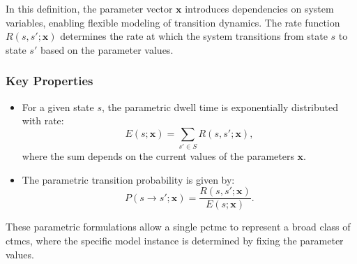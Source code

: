 In this definition, the parameter vector $\mathbf{x}$ introduces dependencies on system variables, enabling flexible modeling of transition dynamics.
The rate function $R(s, s'; \mathbf{x})$ determines the rate at which the system transitions from state $s$ to state $s'$ based on the parameter values.

\subsubsection*{Key Properties}

\begin{itemize}
    \item For a given state $s$, the parametric dwell time is exponentially distributed with rate:
    \begin{equation}
        E(s; \mathbf{x}) = \sum_{s' \in S} R(s, s'; \mathbf{x}),
    \end{equation}
    where the sum depends on the current values of the parameters $\mathbf{x}$.
    \item The parametric transition probability is given by:
    \begin{equation}
        P(s \rightarrow s'; \mathbf{x}) = \frac{R(s, s'; \mathbf{x})}{E(s; \mathbf{x})}.
    \end{equation}
\end{itemize}

These parametric formulations allow a single \gls{pctmc} to represent a broad class of \glspl{ctmc}, where the specific model instance is determined by fixing the parameter values.


